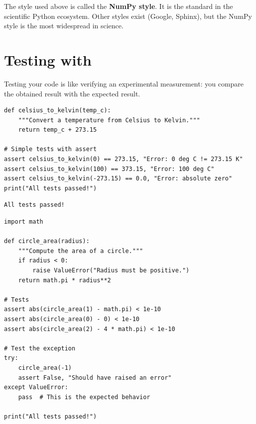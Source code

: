 \begin{remark}
The style used above is called the \textbf{NumPy style}.
It is the standard in the scientific Python ecosystem. Other styles exist
(Google, Sphinx), but the NumPy style is the most widespread in science.
\end{remark}

\section{Testing with }

Testing your code is like verifying an experimental measurement: you compare
the obtained result with the expected result.

\begin{codeblock}[title=\textbf{Python}]
\begin{verbatim}
def celsius_to_kelvin(temp_c):
    """Convert a temperature from Celsius to Kelvin."""
    return temp_c + 273.15

# Simple tests with assert
assert celsius_to_kelvin(0) == 273.15, "Error: 0 deg C != 273.15 K"
assert celsius_to_kelvin(100) == 373.15, "Error: 100 deg C"
assert celsius_to_kelvin(-273.15) == 0.0, "Error: absolute zero"
print("All tests passed!")
\end{verbatim}
\end{codeblock}

\begin{codeoutput}
\begin{verbatim}
All tests passed!
\end{verbatim}
\end{codeoutput}

\begin{codeblock}[title=\textbf{Python}]
\begin{verbatim}
import math

def circle_area(radius):
    """Compute the area of a circle."""
    if radius < 0:
        raise ValueError("Radius must be positive.")
    return math.pi * radius**2

# Tests
assert abs(circle_area(1) - math.pi) < 1e-10
assert abs(circle_area(0) - 0) < 1e-10
assert abs(circle_area(2) - 4 * math.pi) < 1e-10

# Test the exception
try:
    circle_area(-1)
    assert False, "Should have raised an error"
except ValueError:
    pass  # This is the expected behavior

print("All tests passed!")
\end{verbatim}
\end{codeblock}

